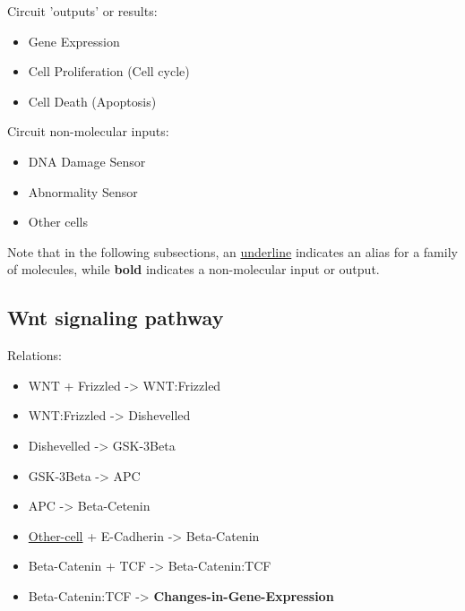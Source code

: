 \documentclass[11pt]{article}
\begin{document}
Circuit 'outputs' or results:
\begin{itemize}
\item Gene Expression
\item Cell Proliferation (Cell cycle)
\item Cell Death (Apoptosis)
\end{itemize}

Circuit non-molecular inputs:
\begin{itemize}
\item DNA Damage Sensor
\item Abnormality Sensor
\item Other cells
\end{itemize}

Note that in the following subsections, an \uline{underline} indicates an alias for a family of molecules, while \textbf{bold} indicates a non-molecular input or output.

\subsection{Wnt signaling pathway}
\label{sec-2-1}
Relations:
\begin{itemize}
\item WNT + Frizzled -> WNT:Frizzled
\item WNT:Frizzled -> Dishevelled
\item Dishevelled -> GSK-3Beta
\item GSK-3Beta -> APC
\item APC -> Beta-Cetenin
\item \uline{Other-cell} + E-Cadherin -> Beta-Catenin
\item Beta-Catenin + TCF -> Beta-Catenin:TCF
\item Beta-Catenin:TCF -> \textbf{Changes-in-Gene-Expression}
\end{itemize}
\end{document}
